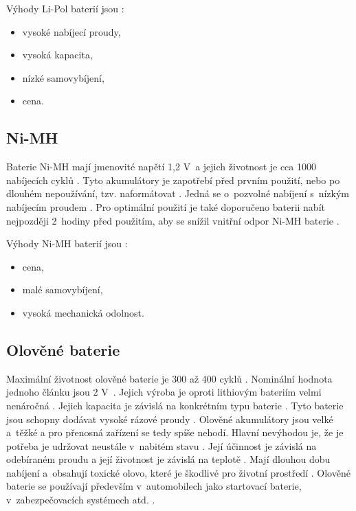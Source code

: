 Výhody Li-Pol baterií jsou \cite{akumulatory}:
\begin{itemize}
  \item vysoké nabíjecí proudy, 
  \item vysoká kapacita, 
  \item nízké samovybíjení,
  \item cena.
\end{itemize}

\subsection{Ni-MH}
Baterie Ni-MH mají jmenovité napětí 1,2 V~a jejich životnost je cca 1000 nabíjecích cyklů \cite{akumulatory}. Tyto akumulátory je zapotřebí před prvním použití, nebo po 
dlouhém nepoužívání, tzv. naformátovat \cite{akumulatory}. 
Jedná se o~pozvolné nabíjení s~nízkým nabíjecím proudem \cite{akumulatory}. Pro optimální použití je také doporučeno baterii nabít nejpozději 2~hodiny před použitím, aby se 
snížil vnitřní odpor Ni-MH baterie \cite{akumulatory}.

Výhody Ni-MH baterií jsou \cite{akumulatory}:
\begin{itemize}
  \item cena,
  \item malé samovybíjení,
  \item vysoká mechanická odolnost.
\end{itemize}

\subsection{Olověné baterie}
Maximální životnost olověné baterie je 300 až 400 cyklů \cite{LiFePO4_malina}. Nominální hodnota jednoho článku jsou 2 V~\cite{olovene}. Jejich výroba je oproti
lithiovým bateriím velmi nenáročná \cite{olovene}. Jejich kapacita je závislá na konkrétním typu baterie \cite{olovene}. Tyto baterie jsou schopny dodávat vysoké
rázové proudy \cite{akumulatory}. Olověné akumulátory jsou velké a~těžké a pro přenosná zařízení se tedy spíše nehodí. Hlavní nevýhodou je, že je potřeba je udržovat 
neustále v~nabitém stavu \cite{olovene}. Její účinnost je závislá na odebíraném proudu a její životnost je závislá na teplotě \cite{olovene}. Mají dlouhou dobu 
nabíjení a~obsahují toxické olovo, které je škodlivé pro životní prostředí \cite{olovene}. Olověné baterie se používají především v~automobilech jako startovací 
baterie, v~zabezpečovacích systémech atd. \cite{olovene}.

